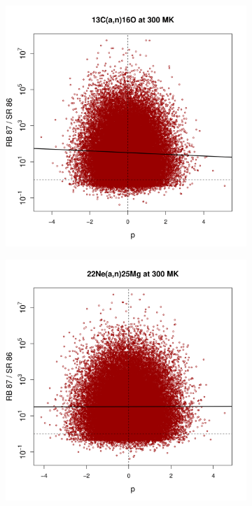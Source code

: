 \begin{figure}[t]
\centering
\begin{subfigure}[b]{0.495\textwidth}
\centering
\includegraphics[width=\textwidth]{Chapter-3/figs/CorrRB87SR86_13C_a_n_16O_300MK.png}  
\end{subfigure}
\hfill
\begin{subfigure}[b]{0.495\textwidth}  
\centering 
\includegraphics[width=\textwidth]{Chapter-3/figs/CorrRB87SR86_22Ne_a_n_25Mg_300MK.png}

\end{subfigure}
\end{figure}
